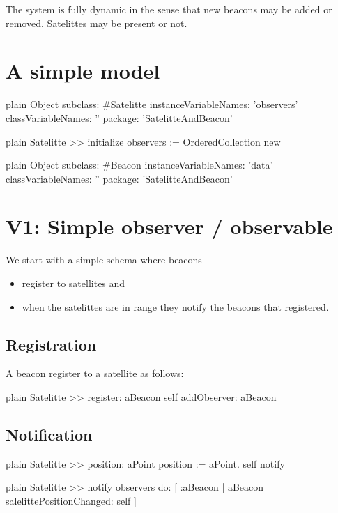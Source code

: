 \documentclass[10pt,twoside,english]{_support/latex/sbabook/sbabook}
\begin{document}
The system is fully dynamic in the sense that new beacons may be added or removed.
Satelittes may be present or not.
\section{A simple model}
\begin{displaycode}{plain}
Object subclass: #Satelitte
	instanceVariableNames: 'observers'
	classVariableNames: ''
	package: 'SatelitteAndBeacon'
\end{displaycode}

\begin{displaycode}{plain}
Satelitte >> initialize
	observers := OrderedCollection new
\end{displaycode}

\begin{displaycode}{plain}
Object subclass: #Beacon
	instanceVariableNames: 'data'
	classVariableNames: ''
	package: 'SatelitteAndBeacon'
\end{displaycode}
\section{V1: Simple observer / observable}
We start with a simple schema where beacons 

\begin{itemize}
\item register to satellites and
\item when the satelittes are in range they notify the beacons that registered.
\end{itemize}
\subsection{Registration}
A beacon register to a satellite as follows:

\begin{displaycode}{plain}
Satelitte >> register: aBeacon
	self addObserver: aBeacon
\end{displaycode}
\subsection{Notification}
\begin{displaycode}{plain}
Satelitte >> position: aPoint
	position := aPoint. 
	self notify
\end{displaycode}

\begin{displaycode}{plain}
Satelitte >> notify
	observers do: [ :aBeacon | aBeacon salelittePositionChanged: self ]
\end{displaycode}
\end{document}
